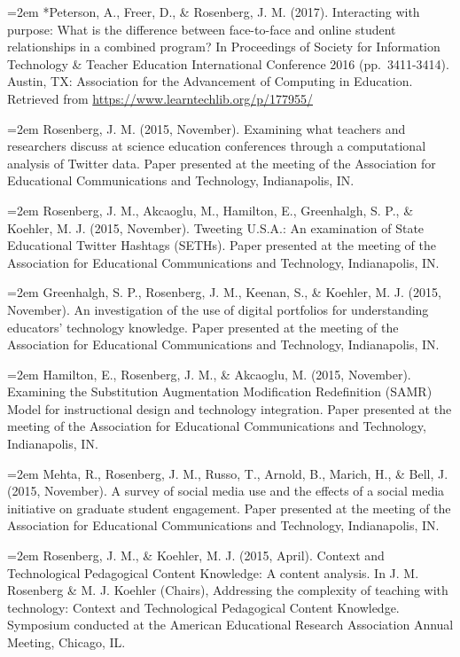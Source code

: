 \documentclass[]{article}
\begin{document}
\hangindent=2em *Peterson, A., Freer, D., \& Rosenberg, J. M. (2017).
Interacting with purpose: What is the difference between face-to-face
and online student relationships in a combined program? In Proceedings
of Society for Information Technology \& Teacher Education International
Conference 2016 (pp.~3411-3414). Austin, TX: Association for the
Advancement of Computing in Education. Retrieved from
\url{https://www.learntechlib.org/p/177955/}

\hangindent=2em Rosenberg, J. M. (2015, November). Examining what
teachers and researchers discuss at science education conferences
through a computational analysis of Twitter data. Paper presented at the
meeting of the Association for Educational Communications and
Technology, Indianapolis, IN.

\hangindent=2em Rosenberg, J. M., Akcaoglu, M., Hamilton, E.,
Greenhalgh, S. P., \& Koehler, M. J. (2015, November). Tweeting U.S.A.:
An examination of State Educational Twitter Hashtags (SETHs). Paper
presented at the meeting of the Association for Educational
Communications and Technology, Indianapolis, IN.

\hangindent=2em Greenhalgh, S. P., Rosenberg, J. M., Keenan, S., \&
Koehler, M. J. (2015, November). An investigation of the use of digital
portfolios for understanding educators' technology knowledge. Paper
presented at the meeting of the Association for Educational
Communications and Technology, Indianapolis, IN.

\hangindent=2em Hamilton, E., Rosenberg, J. M., \& Akcaoglu, M. (2015,
November). Examining the Substitution Augmentation Modification
Redefinition (SAMR) Model for instructional design and technology
integration. Paper presented at the meeting of the Association for
Educational Communications and Technology, Indianapolis, IN.

\hangindent=2em Mehta, R., Rosenberg, J. M., Russo, T., Arnold, B.,
Marich, H., \& Bell, J. (2015, November). A survey of social media use
and the effects of a social media initiative on graduate student
engagement. Paper presented at the meeting of the Association for
Educational Communications and Technology, Indianapolis, IN.

\hangindent=2em Rosenberg, J. M., \& Koehler, M. J. (2015, April).
Context and Technological Pedagogical Content Knowledge: A content
analysis. In J. M. Rosenberg \& M. J. Koehler (Chairs), Addressing the
complexity of teaching with technology: Context and Technological
Pedagogical Content Knowledge. Symposium conducted at the American
Educational Research Association Annual Meeting, Chicago, IL.
\end{document}
